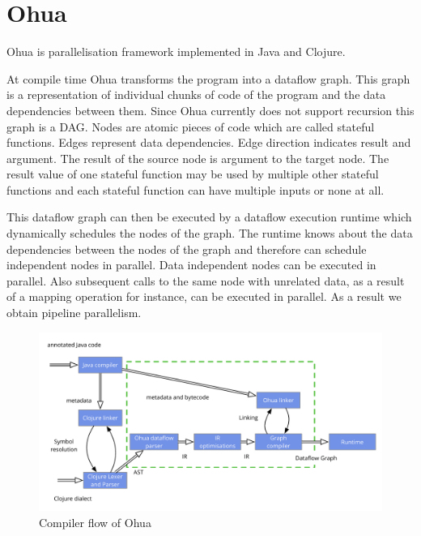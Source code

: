 \chapter{Ohua}

\label{ch:Ohua}

Ohua\cite{Ertel:2015:OID:2807426.2807431}\cite{Ohua:library:link} is parallelisation framework implemented in Java and Clojure.

At compile time Ohua transforms the program into a dataflow graph.
This graph is a representation of individual chunks of code of the program and the data dependencies between them.
Since Ohua currently does not support recursion this graph is a DAG.
Nodes are atomic pieces of code which are called stateful functions.
Edges represent data dependencies.
Edge direction indicates result and argument.
The result of the source node is argument to the target node.
The result value of one stateful function may be used by multiple other stateful functions and each stateful function can have multiple inputs or none at all.

This dataflow graph can then be executed by a dataflow execution runtime which dynamically schedules the nodes of the graph.
The runtime knows about the data dependencies between the nodes of the graph and therefore can schedule independent nodes in parallel.
Data independent nodes can be executed in parallel.
Also subsequent calls to the same node with unrelated data, as a result of a mapping operation for instance, can be executed in parallel.
As a result we obtain pipeline parallelism.


\begin{figure}
  \includegraphics[width=\linewidth]{../Figures/ohua-compiler-flow}
  \caption{Compiler flow of Ohua}
  \label{fig:ohua-compiler-flow}
\end{figure}


